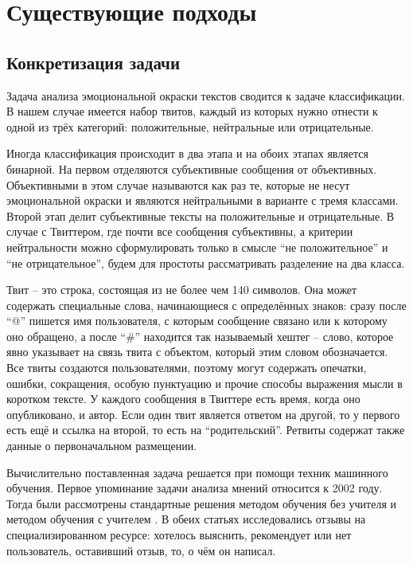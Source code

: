 \section{Существующие подходы}

\subsection{Конкретизация задачи}
Задача анализа эмоциональной окраски текстов сводится к задаче классификации. В
нашем случае имеется набор твитов, каждый из которых нужно отнести к одной из
трёх категорий: положительные, нейтральные или отрицательные.

Иногда классификация происходит в два этапа и на обоих этапах является бинарной.
На первом отделяются субъективные сообщения от объективных. Объективными в этом
случае называются как раз те, которые не несут эмоциональной окраски и
являются нейтральными в варианте с тремя классами. Второй этап делит субъективные
тексты на положительные и отрицательные. В случае с Твиттером, где почти все
сообщения субъективны, а критерии нейтральности можно сформулировать только в
смысле ``не положительное'' и ``не отрицательное'', будем для простоты рассматривать разделение
на два класса.

Твит -- это строка, состоящая из не более чем 140 символов. Она может содержать
специальные слова, начинающиеся с определённых знаков: сразу после ``@'' пишется
имя пользователя, с которым сообщение связано или к которому оно обращено,
а после ``\#'' находится так называемый хештег -- слово, которое явно указывает
на связь твита с объектом, который этим словом обозначается. Все твиты создаются
пользователями, поэтому могут содержать опечатки, ошибки, сокращения,
особую пунктуацию и прочие способы выражения мысли в коротком тексте.
У каждого сообщения в Твиттере есть время, когда оно опубликовано, и автор.
Если один твит является ответом на другой, то у первого есть ещё и ссылка на второй,
то есть на ``родительский''. Ретвиты содержат также данные о первоначальном
размещении.

Вычислительно поставленная задача решается при помощи техник машинного обучения. Первое
упоминание задачи анализа мнений относится к 2002 году. Тогда были рассмотрены
стандартные решения методом обучения без учителя \cite{turney2002thumbs} и методом обучения с
учителем \cite{pang2002thumbs}. В обеих статьях исследовались отзывы на
специализированном ресурсе: хотелось выяснить, рекомендует или нет пользователь, оставивший отзыв,
то, о чём он написал.

